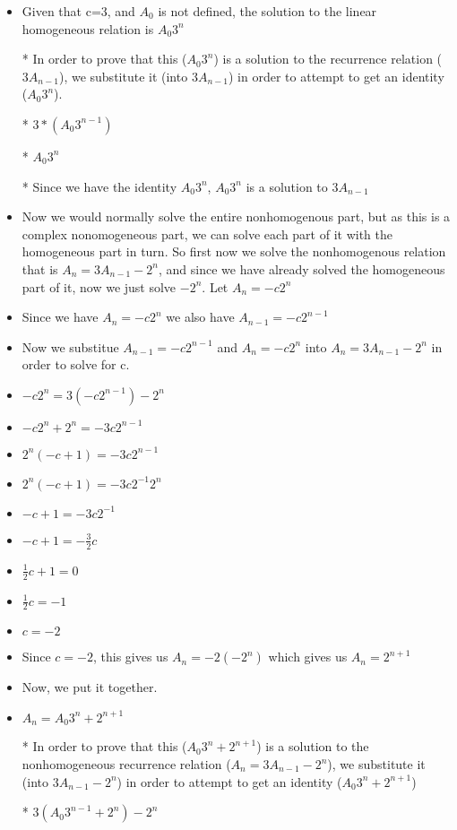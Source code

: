 \documentclass{article}
\begin{document}
\begin{enumerate}
\begin{enumerate}
\begin{itemize}
    \item Given that c=3, and $A_{0}$ is not defined, the solution to the linear homogeneous relation is $A_{0}3^{n}$
    \item [*] In order to prove that this ($A_{0}3^{n}$) is a solution to the recurrence relation ($3A_{n-1}$), we substitute it (into $3A_{n-1}$) in order to attempt to get an identity ($A_{0}3^{n}$).
    \item [*] $3*(A_{0}3^{n-1})$
    \item [*] $A_{0}3^{n}$
    \item [*] Since we have the identity $A_{0}3^{n}$, $A_{0}3^{n}$ is a solution to $3A_{n-1}$
    \item Now we would normally solve the entire nonhomogenous part, but as this is a complex nonomogeneous part, we can solve each part of it with the homogeneous part in turn. So first now we solve the nonhomogenous relation that is $A_{n}=3A_{n-1}-2^{n}$, and since we have already solved the homogeneous part of it, now we just solve $-2^{n}$. Let $A_{n}=-c2^{n}$
    \item Since we have $A_{n}=-c2^{n}$ we also have $A_{n-1}=-c2^{n-1}$
    \item Now we substitue $A_{n-1}=-c2^{n-1}$ and $A_{n}=-c2^{n}$ into $A_{n}=3A_{n-1}-2^{n}$ in order to solve for c.
    \item $-c2^{n}=3(-c2^{n-1})-2^{n}$
    \item $-c2^{n}+2^{n}=-3c2^{n-1}$
    \item $2^{n}(-c+1)=-3c2^{n-1}$
    \item $2^{n}(-c+1)=-3c2^{-1}2^{n}$
    \item $-c+1=-3c2^{-1}$
    \item $-c+1=-\frac{3}{2}c$
    \item $\frac{1}{2}c+1=0$
    \item $\frac{1}{2}c=-1$
    \item $c=-2$
    \item Since $c=-2$, this gives us $A_{n}=-2(-2^{n})$ which gives us $A_{n}=2^{n+1}$
    \item Now, we put it together.
    \item $A_{n}=A_{0}3^{n}+2^{n+1}$
    \item [*] In order to prove that this ($A_{0}3^{n}+2^{n+1}$) is a solution to the nonhomogeneous recurrence relation ($A_{n}=3A_{n-1}-2^{n}$), we substitute it (into $3A_{n-1}-2^{n}$) in order to attempt to get an identity ($A_{0}3^{n}+2^{n+1}$)
    \item [*] $3(A_{0}3^{n-1}+2^{n})-2^{n}$

\end{itemize}
\end{enumerate}
\end{enumerate}
\end{document}
